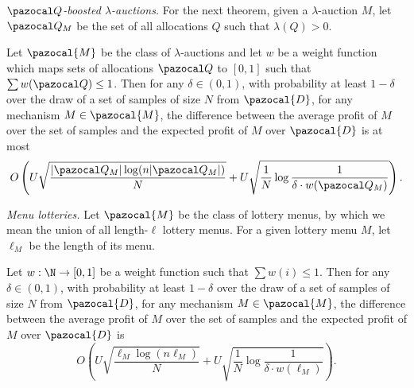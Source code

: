 \bigskip\emph{$\Qset$-boosted $\lambda$-auctions.} For the next theorem, given a $\lambda$-auction $M$, let $\Qset_M$ be the set of all allocations $Q$ such that $\lambda(Q) > 0$.

\begin{theorem}\label{thm:Oboosted_lambda_nonuniform}
Let $\pazocal{M}$ be the class of $\lambda$-auctions and let $w$ be a weight function which maps sets of allocations $\Qset$ to $[0,1]$ such that $\sum w(\Qset) \leq 1$. Then for any $\delta \in (0,1)$, with probability at least $1-\delta$ over the draw of a set of samples of size $N$ from $\pazocal{D}$, for any mechanism $M \in \pazocal{M}$, the difference between the average profit of $M$ over the set of samples and the expected profit of $M$ over $\pazocal{D}$ is at most \[O\left(U\sqrt{\frac{|\Qset_M| \log(n|\Qset_M|)}{N}} + U\sqrt{\frac{1}{N} \log \frac{1}{\delta \cdot w(\Qset_M)}}\right).\]
\end{theorem}

\bigskip\emph{Menu lotteries.} Let $\pazocal{M}$ be the class of lottery menus, by which we mean the union of all length-$\ell$ lottery menus. For a given lottery menu $M$, let $\ell_M$ be the length of its menu.

\begin{theorem}\label{thm:lottery_nonuniform}
Let $w: \N \to [0,1]$ be a weight function such that $\sum w(i) \leq 1$. Then for any $\delta \in (0,1)$, with probability at least $1-\delta$ over the draw of a set of samples of size $N$ from $\pazocal{D}$, for any mechanism $M \in \pazocal{M}$, the difference between the average profit of $M$ over the set of samples and the expected profit of $M$ over $\pazocal{D}$ is 
\[O\left(U\sqrt{\frac{\ell_M \log(n\ell_M)}{N}} + U\sqrt{\frac{1}{N} \log \frac{1}{\delta \cdot w(\ell_M)}}\right).\]
\end{theorem}